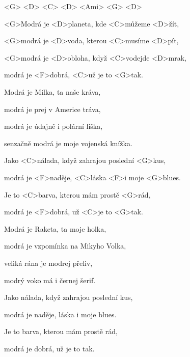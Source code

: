 

<G> <D> <C> <D> <Ami> <G> <D>

\zs
<G>Modrá je <D>planeta, kde <C>můžeme <D>žít,

<G>modrá je <D>voda, kterou <C>musíme <D>pít,

<G>modrá je <D>obloha, když <C>vodejde <D>mrak,

modrá je <F>dobrá, <C>už je to <G>tak.
\ks

\zs
Modrá je Milka, ta naše kráva,

modrá je prej v Americe tráva,

modrá je údajně i polární liška,

senzačně modrá je moje vojenská knížka.
\ks

\zr
Jako <C>nálada, když zahrajou poslední <G>kus,

modrá je <F>naděje, <C>láska <F>i moje <G>blues.

Je to <C>barva, kterou mám prostě <G>rád,

modrá je <F>dobrá, už <C>je to <G>tak.
\kr

\zs
Modrá je Raketa, ta moje holka,

modrá je vzpomínka na Mikyho Volka,

veliká rána je modrej přeliv,

modrý voko má i černej šerif.
\ks

\zs
Jako nálada, když zahrajou poslední kus,

modrá je naděje, láska i moje blues.

Je to barva, kterou mám prostě rád,

modrá je dobrá, už je to tak.
\ks


\kp
